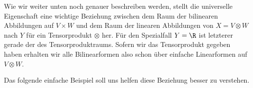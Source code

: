 \documentclass[letterpaper,10pt,german]{jupyterBook}
\begin{document}
\sphinxAtStartPar
{}

\sphinxAtStartPar
Wie wir weiter unten noch genauer beschreiben werden, stellt die universelle Eigenschaft eine wichtige Beziehung zwischen dem Raum der bilinearen Abbildungen auf \(V\times W\) und dem Raum der linearen Abbildungen von \(X = V\otimes W\) nach \(Y\) für ein Tensorprodukt \(\otimes\) her.
Für den Spezialfall \(Y = \R\) ist letzterer gerade der  des Tensorproduktraums.
Sofern wir das Tensorprodukt gegeben haben erhalten wir alle Bilinearformen also schon über einfache Linearformen auf \(V\otimes W\).

\sphinxAtStartPar
Das folgende einfache Beispiel soll uns helfen diese Beziehung besser zu verstehen.
\label{vektoranalysis/tensor:ex:universelleEigenschaft}
\end{document}
